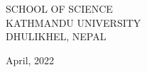 \documentclass[a4paper,12pt]{report}    %
\begin{document}
{{\vspace{2cm}
{\normalsize
\begin{center}
SCHOOL OF SCIENCE\\
KATHMANDU UNIVERSITY\\
DHULIKHEL, NEPAL\\
\end{center}
}

\begin{center}
	{\color{red} April, 2022}
\end{center}

}
}

\thispagestyle{empty}	%

%

%

\newpage



%

%



\tableofcontents


\listoffigures

\listoftables

\newpage


\newpage
{}

\newpage

\newpage

\newpage



\renewcommand{\bibname}{\centering REFERENCES}


\end{document}
